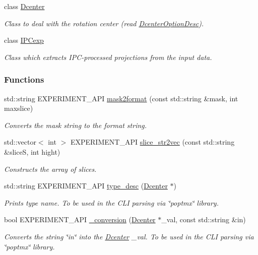 \begin{DoxyCompactItemize}
class \hyperlink{classDcenter}{Dcenter}
\begin{DoxyCompactList}\small\item\em Class to deal with the rotation center (read \hyperlink{group__experiment_gae4e896096ce7a0b4cbfbdd88b7e56286}{DcenterOptionDesc}). \item\end{DoxyCompactList}\item 
class \hyperlink{classIPCexp}{IPCexp}
\begin{DoxyCompactList}\small\item\em Class which extracts IPC-\/processed projections from the input data. \item\end{DoxyCompactList}\end{DoxyCompactItemize}
\subsubsection*{Functions}
\begin{DoxyCompactItemize}
\item 
std::string EXPERIMENT\_\-API \hyperlink{group__experiment_ga3a6c6c808d7fc4dbc4e4b0f4e8ff5c95}{mask2format} (const std::string \&mask, int maxslice)
\begin{DoxyCompactList}\small\item\em Converts the mask string to the format string. \item\end{DoxyCompactList}\item 
std::vector$<$ int $>$ EXPERIMENT\_\-API \hyperlink{group__experiment_ga3e81bacd588a1037f17bcd2fbd5be14a}{slice\_\-str2vec} (const std::string \&sliceS, int hight)
\begin{DoxyCompactList}\small\item\em Constructs the array of slices. \item\end{DoxyCompactList}\item 
std::string EXPERIMENT\_\-API \hyperlink{group__experiment_gab0797bda4347712a932686619a6fa8dd}{type\_\-desc} (\hyperlink{classDcenter}{Dcenter} $\ast$)
\begin{DoxyCompactList}\small\item\em Prints type name. To be used in the CLI parsing via \char`\"{}poptmx\char`\"{} library. \item\end{DoxyCompactList}\item 
bool EXPERIMENT\_\-API \hyperlink{group__experiment_ga24b39e79e97ba4be39d0e53db377f8a7}{\_\-conversion} (\hyperlink{classDcenter}{Dcenter} $\ast$\_\-val, const std::string \&in)
\begin{DoxyCompactList}\small\item\em Converts the string \char`\"{}in\char`\"{} into the \hyperlink{classDcenter}{Dcenter} \_\-val. To be used in the CLI parsing via \char`\"{}poptmx\char`\"{} library. \item\end{DoxyCompactList}\end{DoxyCompactItemize}
